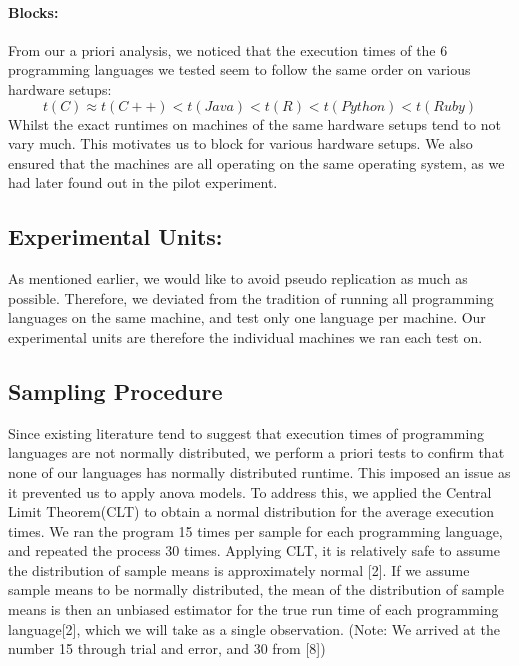 \documentclass[12pt,halfline,a4paper,]{ouparticle}
\begin{document}
\hypertarget{blocks}{%
\paragraph{Blocks:}\label{blocks}}

From our a priori analysis, we noticed that the execution times of the 6
programming languages we tested seem to follow the same order on various
hardware setups: \begin{equation}
t(C) \approx t(C++) < t(Java) < t(R) < t(Python) < t(Ruby)
\end{equation} Whilst the exact runtimes on machines of the same
hardware setups tend to not vary much. This motivates us to block for
various hardware setups. We also ensured that the machines are all
operating on the same operating system, as we had later found out in the
pilot experiment.

\hypertarget{experimental-units}{%
\subsection{Experimental Units:}\label{experimental-units}}

As mentioned earlier, we would like to avoid pseudo replication as much
as possible. Therefore, we deviated from the tradition of running all
programming languages on the same machine, and test only one language
per machine. Our experimental units are therefore the individual
machines we ran each test on.

\hypertarget{sampling-procedure}{%
\subsection{Sampling Procedure}\label{sampling-procedure}}

Since existing literature tend to suggest that execution times of
programming languages are not normally distributed, we perform a priori
tests to confirm that none of our languages has normally distributed
runtime. This imposed an issue as it prevented us to apply anova models.
To address this, we applied the Central Limit Theorem(CLT) to obtain a
normal distribution for the average execution times. We ran the program
15 times per sample for each programming language, and repeated the
process 30 times. Applying CLT, it is relatively safe to assume the
distribution of sample means is approximately normal {[}2{]}. If we
assume sample means to be normally distributed, the mean of the
distribution of sample means is then an unbiased estimator for the true
run time of each programming language{[}2{]}, which we will take as a
single observation. (Note: We arrived at the number 15 through trial and
error, and 30 from {[}8{]})
\end{document}
